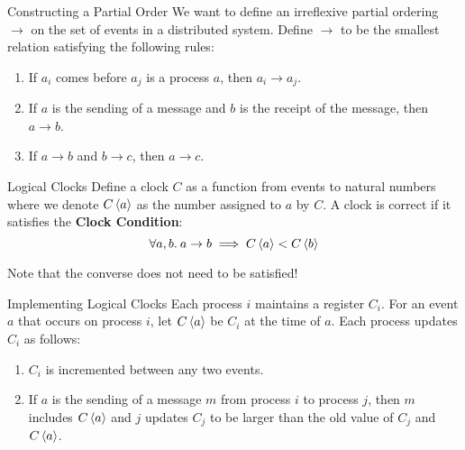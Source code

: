 \begin{frame}{Constructing a Partial Order}
  We want to define an irreflexive partial ordering $\to$ on the set of events
  in a distributed system. Define $\to$ to be the smallest relation satisfying
  the following rules:
  \begin{enumerate}
    \item If $a_i$ comes before $a_j$ is a process $a$, then $a_i \to a_j$.
    \item If $a$ is the sending of a message and $b$ is the receipt of the
      message, then $a \to b$.
    \item If $a \to b$ and $b \to c$, then $a \to c$.
  \end{enumerate}
\end{frame}

\spacetime{}

\begin{frame}{Logical Clocks}
  Define a clock $C$ as a function from events to natural numbers where we
  denote $C\left\langle a \right\rangle$ as the number assigned to $a$ by $C$.
  A clock is correct if it satisfies the \textbf{Clock Condition}:
  \[
    \forall a, b.\> a \to b \implies C\left\langle a \right\rangle < C\left\langle b \right\rangle
  \]

  Note that the converse does not need to be satisfied!
\end{frame}

\begin{frame}{Implementing Logical Clocks}
  Each process $i$ maintains a register $C_i$. For an event $a$ that occurs on
  process $i$, let $C\left\langle a \right\rangle$ be $C_i$ at the time of $a$. Each process
  updates $C_i$ as follows:
  \begin{enumerate}
    \item $C_i$ is incremented between any two events.
    \item If $a$ is the sending of a message $m$ from process $i$ to process
      $j$, then $m$ includes $C\left\langle a \right\rangle$ and $j$ updates $C_j$ to be larger
      than the old value of $C_j$ and $C\left\langle a \right\rangle$.
  \end{enumerate}
\end{frame}

